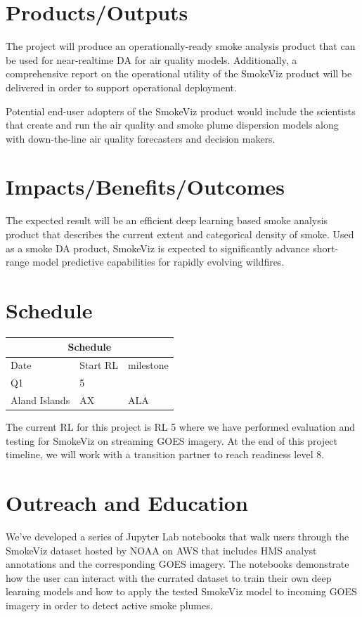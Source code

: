 \section{Products/Outputs}
The project will produce an operationally-ready smoke analysis product that can be used for near-realtime DA for air quality models. Additionally, a comprehensive report on the operational utility of the SmokeViz product will be delivered in order to support operational deployment.

Potential end-user adopters of the SmokeViz product would include the scientists that create and run the air quality and smoke plume dispersion models along with down-the-line air quality forecasters and decision makers.

\section{Impacts/Benefits/Outcomes}

The expected result will be an efficient deep learning based smoke analysis product that describes the current extent and categorical density of smoke. Used as a smoke DA product, SmokeViz is expected to significantly advance short-range model predictive capabilities for rapidly evolving wildfires.

\section{Schedule}

\begin{tabular}{ |p{3cm}|p{3cm}|p{8cm}|  }
 \hline
 \multicolumn{3}{|c|}{Schedule} \\
 \hline
 Date & Start RL & milestone\\
 \hline
 Q1 & 5 & \\
 Aland Islands&   AX  & ALA   \\
 \hline
\end{tabular}

The current RL for this project is RL 5 where we have performed evaluation and testing for SmokeViz on streaming GOES imagery. At the end of this project timeline, we will work with a transition partner to reach readiness level 8.

\section{Outreach and Education}

We've developed a series of Jupyter Lab notebooks that walk users through the SmokeViz dataset hosted by NOAA on AWS that includes HMS analyst annotations and the corresponding GOES imagery. The notebooks demonstrate how the user can interact with the currated dataset to train their own deep learning models and how to apply the tested SmokeViz model to incoming GOES imagery in order to detect active smoke plumes.

